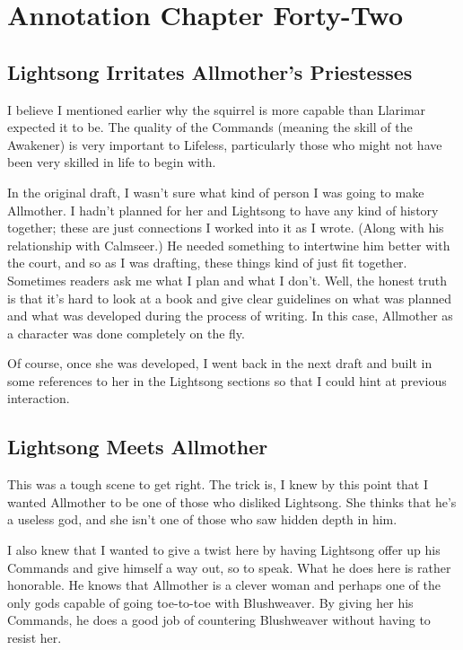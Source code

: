 \section{Annotation Chapter Forty-Two}

\subsection*{Lightsong Irritates Allmother’s Priestesses}

I believe I mentioned earlier why the squirrel is more capable than Llarimar expected it to be. The quality of the Commands (meaning the skill of the Awakener) is very important to Lifeless, particularly those who might not have been very skilled in life to begin with.

In the original draft, I wasn’t sure what kind of person I was going to make Allmother. I hadn’t planned for her and Lightsong to have any kind of history together; these are just connections I worked into it as I wrote. (Along with his relationship with Calmseer.) He needed something to intertwine him better with the court, and so as I was drafting, these things kind of just fit together. Sometimes readers ask me what I plan and what I don’t. Well, the honest truth is that it’s hard to look at a book and give clear guidelines on what was planned and what was developed during the process of writing. In this case, Allmother as a character was done completely on the fly.

Of course, once she was developed, I went back in the next draft and built in some references to her in the Lightsong sections so that I could hint at previous interaction.

\subsection*{Lightsong Meets Allmother}

This was a tough scene to get right. The trick is, I knew by this point that I wanted Allmother to be one of those who disliked Lightsong. She thinks that he’s a useless god, and she isn’t one of those who saw hidden depth in him.

I also knew that I wanted to give a twist here by having Lightsong offer up his Commands and give himself a way out, so to speak. What he does here is rather honorable. He knows that Allmother is a clever woman and perhaps one of the only gods capable of going toe-to-toe with Blushweaver. By giving her his Commands, he does a good job of countering Blushweaver without having to resist her.

